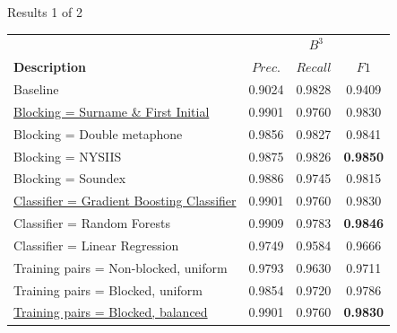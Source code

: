 \documentclass{beamer}
\begin{document}
\begin{frame}{Results 1 of 2}




\begin{table}
\centering
\begin{tabular}{|l|c c c |}
  \hline
                       & \multicolumn{3}{|c|}{\textbf{$B^{3}$}}\\
  \textbf{Description} & $Prec.$ & $Recall$ & $F1$ \\
  \hline
  \hline
Baseline & 0.9024 & 0.9828 & 0.9409  \\
\hline
\underline{Blocking = Surname \& First Initial} & 0.9901 & 0.9760 & 0.9830  \\
Blocking = Double metaphone & 0.9856 & 0.9827 & 0.9841  \\
Blocking = NYSIIS & 0.9875 & 0.9826 & \textbf{0.9850}   \\
Blocking = Soundex & 0.9886 & 0.9745 & 0.9815  \\
\hline
\underline{Classifier = Gradient Boosting Classifier} & 0.9901 & 0.9760 & 0.9830   \\
Classifier = Random Forests & 0.9909 & 0.9783 & \textbf{0.9846}  \\
Classifier = Linear Regression & 0.9749 & 0.9584 & 0.9666 \\
\hline
Training pairs = Non-blocked, uniform & 0.9793 & 0.9630 & 0.9711   \\
Training pairs = Blocked, uniform & 0.9854 & 0.9720 & 0.9786   \\
\underline{Training pairs = Blocked, balanced} & 0.9901 & 0.9760 & \textbf{0.9830}  \\
\hline

\end{tabular}
\end{table}

\end{frame}


\end{document}
